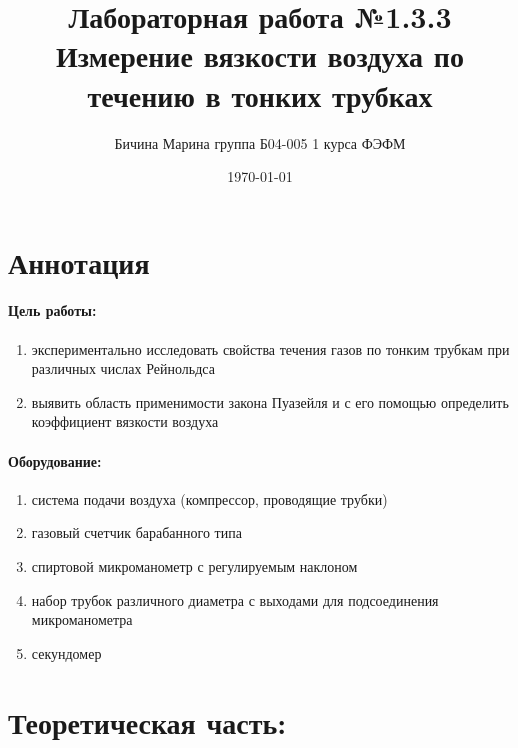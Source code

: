 \documentclass[a4paper,12pt]{article}
\author{Бичина Марина 
группа Б04-005 1 курса ФЭФМ}
\title{Лабораторная работа №1.3.3 \\ Измерение вязкости воздуха по течению в тонких трубках}
\date{\today}
\begin{document}
\renewcommand{\labelenumii}{\arabic{enumii})}

\maketitle
\newpage

\section{Аннотация}

\paragraph{Цель работы:} 
\begin{enumerate}
\itemsep0em
\item 
экспериментально исследовать свойства течения газов по тонким трубкам при различных числах Рейнольдса
\item 
 выявить область применимости закона Пуазейля и с его помощью определить коэффициент вязкости воздуха 
\end{enumerate}
\paragraph{Оборудование:}
\begin{enumerate}
\itemsep0em
\item 
система подачи воздуха (компрессор, проводящие трубки)
\item
газовый счетчик барабанного типа
\item
спиртовой микроманометр с регулируемым наклоном
\item
 набор трубок различного диаметра с выходами для подсоединения микроманометра
\item
  секундомер
\end{enumerate}
\section{Теоретическая часть:}
\end{document}
